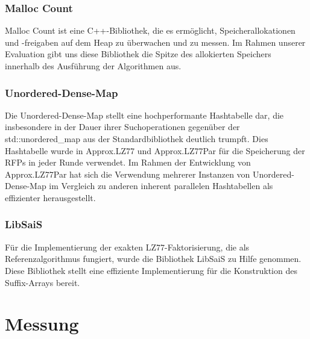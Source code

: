 \subsubsection{Malloc Count}
Malloc Count\cite{malloc_count} ist eine C++-Bibliothek, die es ermöglicht, Speicherallokationen und -freigaben auf dem Heap zu überwachen und zu messen. Im
Rahmen unserer Evaluation gibt uns diese Bibliothek die Spitze des allokierten Speichers innerhalb des Ausführung der Algorithmen aus.

\subsubsection{Unordered-Dense-Map}
Die Unordered-Dense-Map\cite{unordered_dense} stellt eine hochperformante Hashtabelle dar, die insbesondere in der Dauer ihrer Suchoperationen gegenüber
der std::unordered\_map aus der Standardbibliothek deutlich trumpft. Dies Hashtabelle wurde in Approx.LZ77 und Approx.LZ77Par für die Speicherung der
RFPs in jeder Runde verwendet. Im Rahmen der Entwicklung von Approx.LZ77Par hat sich die Verwendung mehrerer Instanzen von Unordered-Dense-Map im Vergleich
zu anderen inherent parallelen Hashtabellen\cite{oneapi}\cite{sharded_map} als effizienter herausgestellt.

\subsubsection{LibSaiS}
Für die Implementierung der exakten LZ77-Faktorisierung, die als Referenzalgorithmus fungiert, wurde die Bibliothek LibSaiS\cite{libsais} zu Hilfe genommen. Diese
Bibliothek stellt eine effiziente Implementierung für die Konstruktion des Suffix-Arrays bereit.

\section{Messung}

